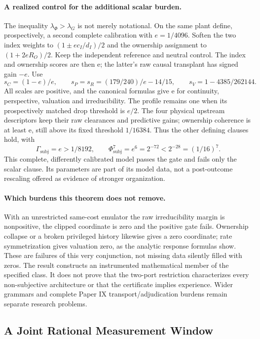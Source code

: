 \documentclass[11pt,a4paper]{article}
\theoremstyle{definition}
\newcommand{\GateSubj}{\Gamma_{\mathrm{subj}}}
\newcommand{\PhiSubj}{\Phi_{\mathrm{subj}}}
\begin{document}
\paragraph{A realized control for the additional scalar burden.}
The inequality $\lambda_\Phi>\lambda_G$ is not merely notational. On the same
plant define, prospectively, a second complete calibration with
$e=1/4096$. Soften the two index weights to $(1\pm e c_I/d_I)/2$ and the
ownership assignment to $(1+2eR_O)/2$. Keep the independent reference and
neutral control. The index and ownership scores are then e; the latter's
raw causal transplant has signed gain $-e$. Use
\[
 s_C=(1-e)/e,\qquad
 s_P=s_R=(179/240)/e-14/15,\qquad
 s_V=1-4385/262144.
\]
All scales are positive, and the canonical formulas give e for continuity,
perspective, valuation and irreducibility. The profile remains one when its
prospectively matched drop threshold is $e/2$. The four physical upstream
descriptors keep their raw clearances and predictive gains; ownership
coherence is at least e, still above its fixed threshold $1/16384$.
Thus the other defining clauses hold, with
\[
 \GateSubj=e>1/8192,\qquad
 \PhiSubj^7=e^6=2^{-72}<2^{-28}=(1/16)^7.
\]
This complete, differently calibrated model passes the gate and fails only
the scalar clause. Its parameters are part of its model data, not a
post-outcome rescaling offered as evidence of stronger organization.

\paragraph{Which burdens this theorem does not remove.}
With an unrestricted same-cost emulator the raw irreducibility margin is
nonpositive, the clipped coordinate is zero and the positive gate fails.
Ownership collapse or a broken privileged history likewise gives a zero
coordinate; rate symmetrization gives valuation zero, as the analytic response
formulas show. These are failures of this very conjunction, not missing data
silently filled with zeros. The result constructs an instrumented mathematical
member of the specified class. It does not prove that the two-port restriction
characterizes every non-subjective architecture or that the certificate implies
experience. Wider grammars and complete Paper IX transport/adjudication burdens
remain separate research problems.

\subsection{A Joint Rational Measurement Window}
\end{document}
